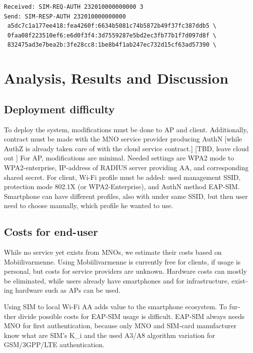 \documentclass[12pt,a4paper,english]{tutthesis}
\begin{document}
\begin{otherlanguage}{english}
\scriptsize
\begin{verbatim}
Received: SIM-REQ-AUTH 232010000000000 3
Send: SIM-RESP-AUTH 232010000000000 
 a5dc7c1a177ee418:fea4260f:6634b5081c74b5872b49f37fc387ddb5 \
 0faa08f223510ef6:e6d0f3f4:3d7559287e5bd2ec3fb77b1f7d097d8f \
 832475ad3e7bea2b:3fe28cc8:1be8b4f1ab247ec732d15cf63ad57390 \
\end{verbatim}
\normalsize


\chapter{Analysis, Results and Discussion}
\label{sec-6}



\section{Deployment difficulty}
\label{sec-6-1}

To deploy the system, modifications must be done to AP and client.
Additionally, contract must be made with the MNO service
provider producing AuthN [while AuthZ is already taken care of with
the cloud service contract.]  [TBD, leave cloud out ]
For AP, modifications are minimal. Needed settings are
WPA2 mode to WPA2-enterprise, IP-address of RADIUS server providing 
AA, and corresponding shared secret.
For client, Wi-Fi profile must be added: used management SSID,
protection mode 802.1X (or WPA2-Enterprise), and AuthN method EAP-SIM.
Smartphone can have different profiles, also with under same SSID, but
then user need to choose manually, which profile he wanted to use.

\section{Costs for end-user}
\label{sec-6-2}
While no service yet exists from MNOs, we estimate their costs based
on Mobiilivarmenne. Using Mobiilivarmenne is currently free for
clients, if usage is personal, but costs for service providers are
unknown.  Hardware costs can mostly be eliminated, while users already
have smartphones and for infrastructure, existing hardware such as APs
can be used.

Using SIM to local Wi-Fi AA adds value to the smartphone ecosystem.
To further divide possible costs for EAP-SIM usage
is difficult.
EAP-SIM always needs MNO for first authentication,
because only MNO and SIM-card manufacturer know 
what are SIM's K\_i and the used A3/A8 algorithm variation
for GSM/3GPP/LTE authentication.


\end{otherlanguage}
\end{document}
